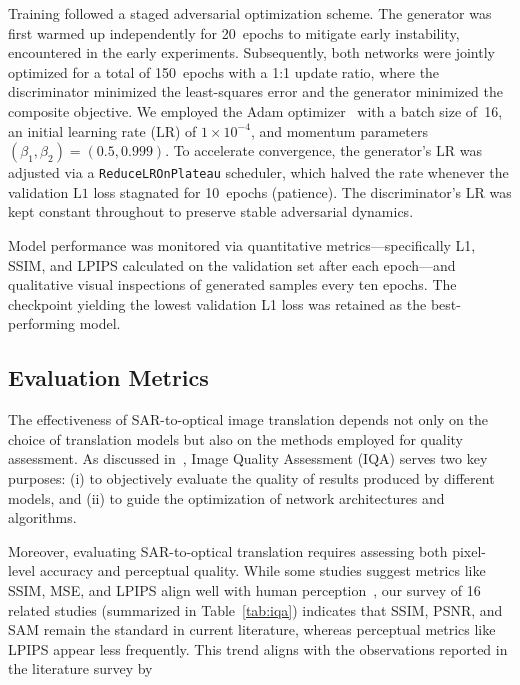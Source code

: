 \documentclass[remotesensing,article,submit,pdftex,moreauthors]{Definitions/mdpi}
\begin{document}
Training followed a staged adversarial optimization scheme. The generator was first warmed up independently for 20~epochs to mitigate early instability, encountered in the early experiments. Subsequently, both networks were jointly optimized for a total of 150~epochs with a 1:1 update ratio, where the discriminator minimized the least-squares error and the generator minimized the composite objective. We employed the Adam optimizer~\cite{adam_optimizer_2017} with a batch size of~16, an initial learning rate (\(\mathrm{LR}\)) of \(1\times10^{-4}\), and momentum parameters \((\beta_1, \beta_2) = (0.5, 0.999)\). To accelerate convergence, the generator's \(\mathrm{LR}\) was adjusted via a \texttt{ReduceLROnPlateau} scheduler, which halved the rate whenever the validation \(\mathrm{L1}\) loss stagnated for 10~epochs (patience). The discriminator's \(\mathrm{LR}\) was kept constant throughout to preserve stable adversarial dynamics.

Model performance was monitored via quantitative metrics—specifically L1, SSIM, and LPIPS calculated on the validation set after each epoch—and qualitative visual inspections of generated samples every ten epochs. The checkpoint yielding the lowest validation L1 loss was retained as the best-performing model.


\subsection{Evaluation Metrics}
\label{sec:evaluation_metrics}
The effectiveness of SAR-to-optical image translation depends not only on the choice of translation models but also on the methods employed for quality assessment. As discussed in~\cite{quality_assessment_S2OT}, Image Quality Assessment (IQA) serves two key purposes: (i) to objectively evaluate the quality of results produced by different models, and (ii) to guide the optimization of network architectures and algorithms.

Moreover, evaluating SAR-to-optical translation requires assessing both pixel-level accuracy and perceptual quality. While some studies suggest metrics like SSIM, MSE, and LPIPS align well with human perception~\cite{quality_assessment_S2OT}, our survey of 16 related studies (summarized in Table~\ref{tab:iqa}) indicates that SSIM, PSNR, and SAM remain the standard in current literature, whereas perceptual metrics like LPIPS appear less frequently. This trend aligns with the observations reported in the literature survey by~\cite{sar_2_opt_CGAN_survey_taxonomy}
\end{document}

